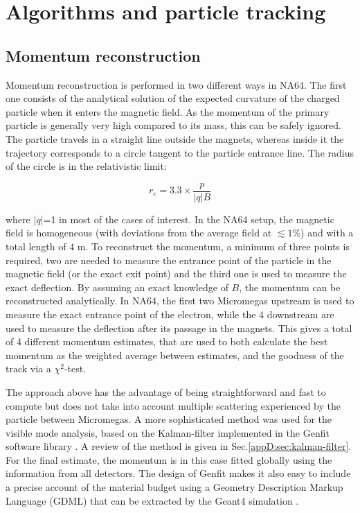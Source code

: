 
\newcommand{\appdird}{appendices/plots/appendixD}

\chapter{Algorithms and particle tracking}

\label{AppendixD}


\section{Momentum reconstruction}
\label{appD:sec:mom-reco}

Momentum reconstruction is performed in two different ways in NA64. The first one consists of the analytical solution of the expected curvature of the charged particle when it enters the magnetic field. As the momentum of the primary particle is generally very high compared to its mass, this can be safely ignored. The particle travels in a straight line outside the magnets, whereas inside it the trajectory corresponds to a circle tangent to the particle entrance line. The radius of the circle is in the relativistic limit:

\begin{equation}
  \label{eq:gyro-radius}
  r_c = 3.3 \times \frac{p}{\left|q\right|B}
\end{equation}

where $\left|q\right|$=1 in most of the cases of interest. In the NA64 setup, the magnetic field is homogeneous (with deviations from the average field at $\lesssim 1\%$) and with a total length of 4 \si{\meter}. To reconstruct the momentum, a minimum of three points is required, two are needed to measure the entrance point of the particle in the magnetic field (or the exact exit point) and the third one is used to measure the exact deflection. By assuming an exact knowledge of $B$, the momentum can be reconstructed analytically. In NA64, the first two Micromegas upstream is used to measure the exact entrance point of the electron, while the 4 downstream are used to measure the deflection after its passage in the magnets. This gives a total of 4 different momentum estimates, that are used to both calculate the best momentum as the weighted average between estimates, and the goodness of the track via a $\chi^2$-test.

The approach above has the advantage of being straightforward and fast to compute but does not take into account multiple scattering experienced by the particle between Micromegas. A more sophisticated method was used for the visible mode analysis, based on the Kalman-filter implemented in the Genfit software library \cite{genfit}. A review of the method is given in Sec.\ref{appD:sec:kalman-filter}. For the final estimate, the momentum is in this case fitted globally using the information from all detectors. The design of Genfit makes it also easy to include a precise account of the material budget using a Geometry Description Markup Language (GDML) that can be extracted by the Geant4 simulation \cite{gdml}.


